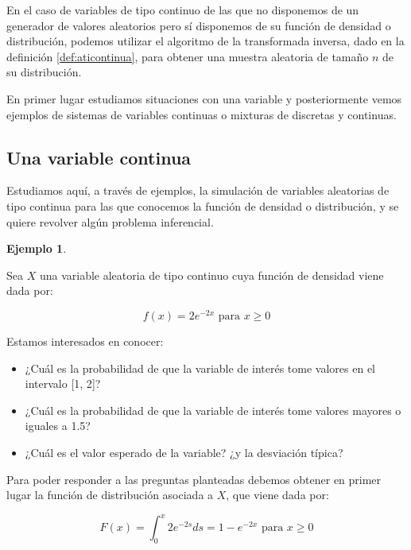 \documentclass[
]{book}
\providecommand{\tightlist}{%
  \setlength{\itemsep}{0pt}\setlength{\parskip}{0pt}}
\theoremstyle{definition}
\theoremstyle{definition}
\newtheorem{example}{Ejemplo}[chapter]
\theoremstyle{definition}
\theoremstyle{definition}
\theoremstyle{remark}
\begin{document}
En el caso de variables de tipo continuo de las que no disponemos de un generador de valores aleatorios pero sí disponemos de su función de densidad o distribución, podemos utilizar el algoritmo de la transformada inversa, dado en la definición \ref{def:aticontinua}, para obtener una muestra aleatoria de tamaño \(n\) de su distribución.

En primer lugar estudiamos situaciones con una variable y posteriormente vemos ejemplos de sistemas de variables continuas o mixturas de discretas y continuas.

\hypertarget{una-variable-continua}{%
\subsection{Una variable continua}\label{una-variable-continua}}

Estudiamos aquí, a través de ejemplos, la simulación de variables aleatorias de tipo continua para las que conocemos la función de densidad o distribución, y se quiere revolver algún problema inferencial.

\begin{example}
\protect\hypertarget{exm:cont1}{}\label{exm:cont1}

Sea \(X\) una variable aleatoria de tipo continuo cuya función de densidad viene dada por:

\begin{equation*}
f(x) = 2e^{-2x}  \text{ para } x \geq 0
\end{equation*}

Estamos interesados en conocer:

\begin{itemize}
\tightlist
\item
  ¿Cuál es la probabilidad de que la variable de interés tome valores en el intervalo {[}1, 2{]}?
\item
  ¿Cuál es la probabilidad de que la variable de interés tome valores mayores o iguales a 1.5?
\item
  ¿Cuál es el valor esperado de la variable? ¿y la desviación típica?
\end{itemize}

\end{example}

Para poder responder a las preguntas planteadas debemos obtener en primer lugar la función de distribución asociada a \(X\), que viene dada por:

\begin{equation}
F(x) = \int_0^x 2e^{-2s} ds=1 - e^{-2x} \text{ para } x \geq 0
\label{eq:fd1-16}
\end{equation}
\end{document}
